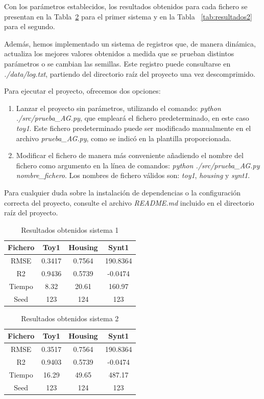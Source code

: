 \documentclass[conference,a4paper]{IEEEtran}
\begin{document}
Con los parámetros establecidos, los resultados obtenidos para cada fichero se presentan en la Tabla~\ref{tab:resultados1} para el primer sistema y en la Tabla ~\ref{tab:resultados2} para el segundo. 

Además, hemos implementado un sistema de registros que, de manera dinámica, actualiza los mejores valores obtenidos a medida que se prueban distintos parámetros o se cambian las semillas. Este registro puede consultarse en \textit{./data/log.txt}, partiendo del directorio raíz del proyecto una vez descomprimido.

Para ejecutar el proyecto, ofrecemos dos opciones: 
\begin{enumerate}
    \item Lanzar el proyecto sin parámetros, utilizando el comando: \textit{python ./src/prueba\_AG.py}, que empleará el fichero predeterminado, en este caso \textit{toy1}. Este fichero predeterminado puede ser modificado manualmente en el archivo \textit{prueba\_AG.py}, como se indicó en la plantilla proporcionada.

    \item Modificar el fichero de manera más conveniente añadiendo el nombre del fichero como argumento en la línea de comandos: \textit{python ./src/prueba\_AG.py nombre\_fichero}. Los nombres de fichero válidos son: \textit{toy1}, \textit{housing} y \textit{synt1}.
\end{enumerate}


Para cualquier duda sobre la instalación de dependencias o la configuración correcta del proyecto, consulte el archivo \textit{README.md} incluido en el directorio raíz del proyecto.


\begin{table} [H]
  \caption{Resultados obtenidos sistema 1}
  \label{tab:resultados1}
  \centering
  \begin{tabular}{cccc}
    \toprule
     Fichero & Toy1 & Housing & Synt1 \\
    \midrule
    RMSE & 0.3417 & 0.7564 & 190.8364 \\
    R2 & 0.9436 & 0.5739 & -0.0474 \\
    \midrule
    Tiempo & 8.32 & 20.61 & 160.97 \\
    Seed & 123 & 124 & 123 \\
    \bottomrule
  \end{tabular}
\end{table}

\begin{table} [H]
  \caption{Resultados obtenidos sistema 2}
  \label{tab:resultados1}
  \centering
  \begin{tabular}{cccc}
    \toprule
     Fichero & Toy1 & Housing & Synt1 \\
    \midrule
    RMSE & 0.3517 & 0.7564 & 190.8364 \\
    R2 & 0.9403 & 0.5739 & -0.0474 \\
    \midrule
    Tiempo & 16.29 & 49.65 & 487.17 \\
    Seed & 123 & 124 & 123 \\
    \bottomrule
  \end{tabular}
\end{table}
\end{document}
